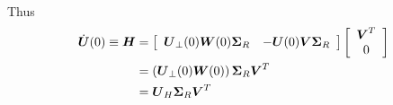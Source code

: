 \documentclass[11pt]{article}
\begin{document}
\begin{enumerate}
\begin{align*}
\end{align*}
Thus
\begin{align}
\dot{\boldsymbol{U}}(0)\equiv \boldsymbol{H} &=   \left[\begin{array}{cc}
\boldsymbol{U}_{\bot}(0) \boldsymbol{W}(0)\boldsymbol{\Sigma}_{R} & - \boldsymbol{U}(0)\boldsymbol{V}\boldsymbol{\Sigma}_{R} 
\end{array}\right]\left[\begin{array}{c}
\boldsymbol{V}^{T} \\
 0\\ 
\end{array} \right] \nonumber\\
&= \left(\boldsymbol{U}_{\bot}(0) \boldsymbol{W}(0)\right)\boldsymbol{\Sigma}_{R} \boldsymbol{V}^{T} \nonumber\\
&= \boldsymbol{U}_{H}\boldsymbol{\Sigma}_{R} \boldsymbol{V}^{T} \label{eqn: geo_Grass_derivation_1}
\end{align}


\end{enumerate}
\end{document}

